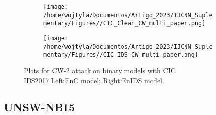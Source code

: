 \documentclass[conference]{IEEEtran}
\begin{document}
	\begin{figure}[H]
		\centering
		\begin{subfigure}[b]{0.45\textwidth}
			\texttt{[image: /home/wojtyla/Documentos/Artigo\_2023/IJCNN\_Suplementary/Figures//CIC\_Clean\_CW\_multi\_paper.png]}
			\label{fig:1}
		\end{subfigure}
		\hfill
		\begin{subfigure}[b]{0.45\textwidth}
			\texttt{[image: /home/wojtyla/Documentos/Artigo\_2023/IJCNN\_Suplementary/Figures//CIC\_IDS\_CW\_multi\_paper.png]}
			\label{fig:4}
		\end{subfigure}
		\caption{Plots for CW-2 attack on binary models with CIC IDS2017.Left:EnC model; Right:EnIDS model.}
		\label{fig:cic_cw_multi}
	\end{figure}
	
	
	
	\subsection{UNSW-NB15}
	
\end{document}
